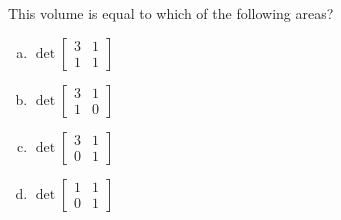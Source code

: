 \begin{applicationActivities}{2}{26}
\begin{activity}{5}
\begin{center}
  \end{center}
This volume is equal to which of the following areas?
\begin{multicols}{4}
\begin{enumerate}[(a)]
\item $\det \begin{bmatrix} 3 & 1 \\ 1 & 1 \end{bmatrix}$
\item $\det \begin{bmatrix} 3 & 1 \\ 1 & 0 \end{bmatrix}$
\item $\det \begin{bmatrix} 3 & 1 \\ 0 & 1 \end{bmatrix}$
\item $\det \begin{bmatrix} 1 & 1 \\ 0 & 1 \end{bmatrix}$
\end{enumerate}
\end{multicols}
\end{activity}


\end{applicationActivities}
